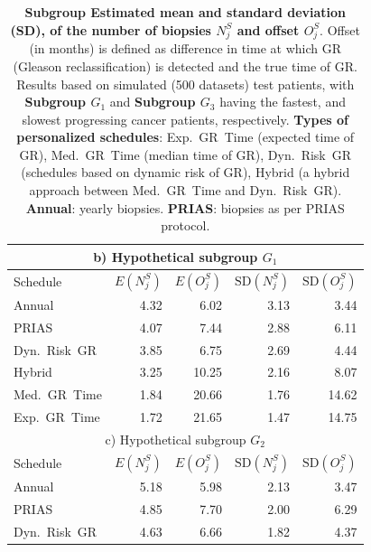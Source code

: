 \begin{table}
\small
\centering
\caption{\textbf{Subgroup Estimated mean and standard deviation (SD), of the number of biopsies $N^S_j$ and offset $O^S_j$}. Offset (in months) is defined as difference in time at which GR (Gleason reclassification) is detected and the true time of GR. Results based on simulated (500 datasets) test patients, with \textbf{Subgroup $G_1$} and \textbf{Subgroup $G_3$} having the fastest, and slowest progressing cancer patients, respectively. \textbf{Types of personalized schedules}: Exp.~GR~Time (expected time of GR), Med.~GR~Time (median time of GR), Dyn.~Risk~GR (schedules based on dynamic risk of GR), Hybrid (a hybrid approach between Med.~GR~Time and Dyn.~Risk~GR). \textbf{Annual}: yearly biopsies. \textbf{PRIAS}: biopsies as per PRIAS protocol.}
\label{c2:table:sim_study_pooled_estimates_subgroup}
\begin{tabular}{lrrrr}
\toprule
\multicolumn{5}{c}{b) Hypothetical subgroup $G_1$}\\
\midrule
Schedule        & $E(N^S_j)$ & $E(O^S_j)$ & ${\mbox{SD}(N^S_j)}$ & ${\mbox{SD}(O^S_j)}$ \\
\midrule
Annual         & 4.32            & 6.02                & 3.13          & 3.44              \\
PRIAS          & 4.07            & 7.44                & 2.88          & 6.11    \\
Dyn.~Risk~GR       & 3.85            & 6.75                & 2.69          & 4.44              \\
Hybrid       & 3.25            & 10.25               & 2.16          & 8.07              \\
Med.~GR~Time & 1.84            & 20.66               & 1.76          & 14.62             \\
Exp.~GR~Time & 1.72            & 21.65               & 1.47          & 14.75             \\
\midrule     
\multicolumn{5}{c}{c) Hypothetical subgroup $G_2$}\\
\midrule
Schedule        & $E(N^S_j)$ & $E(O^S_j)$ & ${\mbox{SD}(N^S_j)}$ & ${\mbox{SD}(O^S_j)}$ \\
\midrule
Annual         & 5.18            & 5.98                & 2.13          & 3.47              \\
PRIAS          & 4.85            & 7.70                & 2.00          & 6.29        \\
Dyn.~Risk~GR       & 4.63            & 6.66                & 1.82          & 4.37              \\

\end{tabular}
\end{table}
